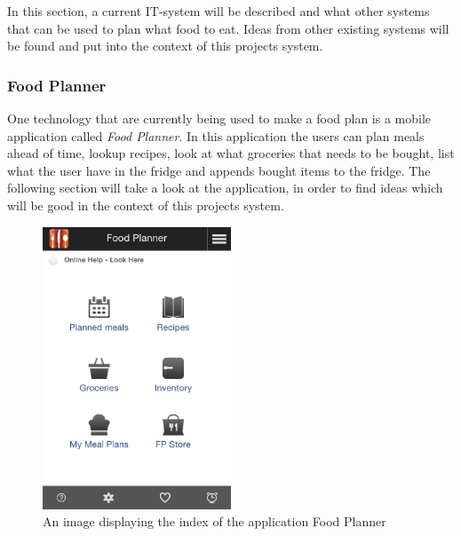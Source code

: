 In this section, a current IT-system will be described and what other systems that can be used to plan what food to eat.
Ideas from other existing systems will be found and put into the context of this projects system. 

\subsubsection{Food Planner}
One technology that are currently being used to make a food plan is a mobile application called \textit{Food Planner}.
In this application the users can plan meals ahead of time, lookup recipes, look at what groceries that needs to be bought, list what the user have in the fridge and appends bought items to the fridge.
The following section will take a look at the application, in order to find ideas which will be good in the context of this projects system.

\begin{figure}[H]
    \centering
    \includegraphics[width=0.5\textwidth]{Grafik/FoodPlanner/index}
    \caption{An image displaying the index of the application Food Planner}
    \label{FoodPlannerIndex}
\end{figure}

